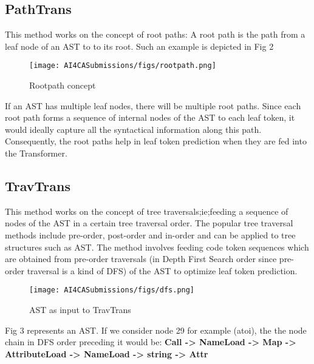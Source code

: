 \documentclass[sigplan,screen,9pt]{acmart}
\begin{document}
    \subsection{PathTrans}
    This method works on the concept of root paths: A root path is the path from a leaf node of an AST to to its root. Such an example is depicted in Fig 2
    \begin{figure}[h]
        \centering
        \texttt{[image: AI4CASubmissions/figs/rootpath.png]}
        \caption{Rootpath concept}
    \end{figure}
    If an AST has multiple leaf nodes, there will be multiple root paths. Since each root path forms a sequence of internal nodes of the AST to each leaf token, it would ideally capture all the syntactical information along this path. Consequently, the root paths help in leaf token prediction when they are fed into the Transformer.
    \subsection{TravTrans}
    This method works on the concept of tree traversals;ie;feeding a sequence of nodes of the AST in a certain tree traversal order. The popular tree traversal methods include pre-order, post-order and in-order and can be applied to tree structures such as AST. The method involves feeding code token sequences which are obtained from pre-order traversals (in Depth First Search order since pre-order traversal is a kind of DFS) of the AST to optimize leaf token prediction.
    \begin{figure}[h]
        \centering
        \texttt{[image: AI4CASubmissions/figs/dfs.png]}
        \caption{AST as input to TravTrans}
    \end{figure}
    Fig 3 represents an AST. If we consider node 29 for example (atoi), the the node chain in DFS order preceding it would be:
    \newline
    \textbf{Call -> NameLoad -> Map -> AttributeLoad -> NameLoad -> string -> Attr}
\end{document}
